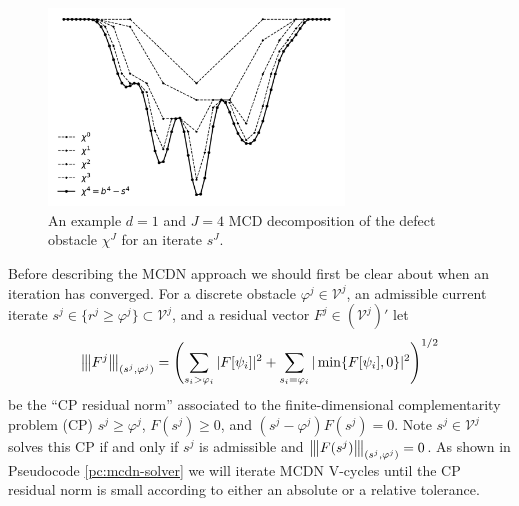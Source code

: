 \documentclass[letterpaper,final,12pt,reqno]{amsart}
\theoremstyle{claim}
\newcommand{\vertiii}[1]{{\left\vert\kern-0.25ex\left\vert\kern-0.25ex\left\vert #1 \right\vert\kern-0.25ex\right\vert\kern-0.25ex\right\vert}}
\numberwithin{equation}{section}
\numberwithin{figure}{section}
\numberwithin{table}{section}
\numberwithin{theorem}{section}
\begin{document}
\begin{figure}[t]
\begin{center}
\includegraphics[width=0.7\textwidth]{fixfigs/decompclassical.pdf}
\end{center}
\caption{An example $d=1$ and $J=4$ MCD decomposition of the defect obstacle $\chi^J$ for an iterate $s^J$.}
\label{fig:decompclassical}
\end{figure}

Before describing the MCDN approach we should first be clear about when an iteration has converged.  For a discrete obstacle $\varphi^j \in \mathcal{V}^j$, an admissible current iterate $s^j\in \{r^j \ge \varphi^j\} \subset \mathcal{V}^j$, and a residual vector $F^j \in (\mathcal{V}^j)'$ let
\begin{equation}
\vertiii{F^j}_{(s^j,\varphi^j)} = \left(\sum_{s_i > \varphi_i} |F[\psi_i]|^2 + \sum_{s_i = \varphi_i} |\min\{F[\psi_i],0\}|^2\right)^{1/2} \label{eq:cpnorm}
\end{equation}
be the ``CP residual norm'' associated to the finite-dimensional complementarity problem (CP) $s^j \ge \varphi^j$, $F(s^j) \ge 0$, and $(s^j-\varphi^j) F(s^j) = 0$.  Note $s^j \in \mathcal{V}^j$ solves this CP if and only if $s^j$ is admissible and $\vertiii{F(s^j)}_{(s^j,\varphi^j)}=0$.  As shown in Pseudocode \ref{pc:mcdn-solver} we will iterate MCDN V-cycles until the CP residual norm is small according to either an absolute or a relative tolerance.
\end{document}
